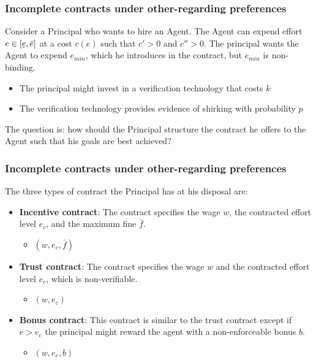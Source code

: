 \documentclass{beamer}
\newcommand{\ubar}[1]{\underaccent{\bar}{#1}}
\begin{document}
\begin{frame}
	\frametitle{Incomplete contracts under other-regarding preferences}

	Consider a Principal who wants to hire an Agent. The Agent can expend effort $e \in [\ubar{e}, \bar{e}]$ at a cost $c(e)$ such that $c'>0$ and $c''>0$. The principal wants the Agent to expend $e_{min}$, which he introduces in the contract, but $e_{min}$ is non-binding.

\begin{itemize}
\item The principal might invest in a verification technology that costs $k$
\item The verification technology provides evidence of shirking with probability $p$
\end{itemize}
		
The question is: how should the Principal structure the contract he offers to the Agent such that his goals are best achieved?		
		
		
\end{frame}

\begin{frame}
	\frametitle{Incomplete contracts under other-regarding preferences}
	The three types of contract the Principal has at his disposal are:
\begin{itemize}
	\item \textbf{Incentive contract}: The contract specifies the wage $w$, the contracted effort level $e_c$, and the maximum fine $\bar{f}$.
	\begin{itemize}
	\item $\left(w,e_c,\bar{f}\right)$
	\end{itemize}
	\item \textbf{Trust contract}: The contract specifies the wage $w$ and the contracted effort level $e_c$, which is non-verifiable.
	\begin{itemize}
	\item $\left(w,e_c\right)$
	\end{itemize}
	\item \textbf{Bonus contract}: This contract is similar to the trust contract except if $e>e_c$ the principal might reward the agent with a non-enforceable bonus $b$.
	\begin{itemize}
	\item $\left(w,e_c,b\right)$
	\end{itemize}
\end{itemize}
		
\end{frame}
\end{document}
